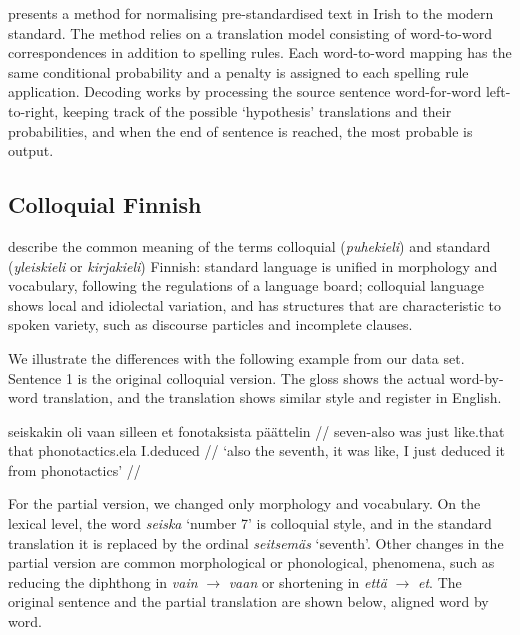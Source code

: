 \documentclass[11pt]{article}
\begin{document}
 presents a method for normalising pre-standardised text in Irish to 
the modern standard. The method relies on a translation model consisting of word-to-word 
correspondences in addition to spelling rules. Each word-to-word mapping has the same
conditional probability and a penalty is assigned to each spelling rule application. Decoding
works by processing the source sentence word-for-word left-to-right, keeping track of the 
possible `hypothesis' translations and their probabilities, and when the end of 
sentence is reached, the most probable is output.

\subsection{Colloquial Finnish}


 describe the common meaning of the terms colloquial (\emph{puhekieli}) and standard (\emph{yleiskieli} or \emph{kirjakieli}) Finnish: standard language is unified in morphology and vocabulary, following the regulations of a language board; colloquial language shows local and idiolectal variation, and has structures that are characteristic to spoken variety,  such as discourse particles and incomplete clauses.




We illustrate the differences with the following example from our data set. Sentence 1 is the original colloquial version. The gloss shows the actual word-by-word translation, and the translation shows similar style and register in English.

\ex
\begingl
\gla seiskakin oli vaan silleen et fonotaksista p\"{a}\"{a}ttelin //
\glb seven-{\sc also} was just like.that that phonotactics.{\sc ela} I.deduced //
\glft `also the seventh, it was like, I just deduced it from phonotactics' //
\endgl
\xe


For the partial version, we changed only morphology and vocabulary. On the lexical level, the word \emph{seiska} `number 7' is colloquial style, and in the standard translation it is replaced by the ordinal \emph{seitsem\"{a}s} `seventh'.  Other changes in the partial version are common morphological or phonological, phenomena, such as reducing the diphthong in \emph{vain} $\rightarrow$ \emph{vaan} or shortening in  \emph{ett\"{a}} $\rightarrow$ \emph{et}. The original sentence and the partial translation are shown below, aligned word by word.
\end{document}
